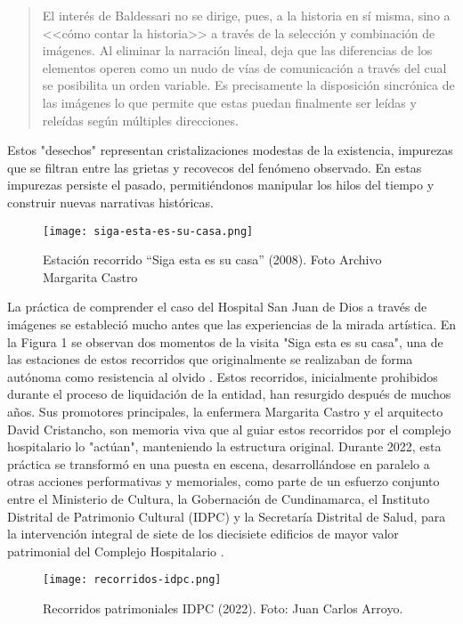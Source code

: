 \begin{quote}
    El interés de Baldessari no se dirige, pues, a la historia en sí misma, sino a <<cómo contar la historia>> a través de la selección y combinación de imágenes. Al eliminar la narración lineal, deja que las diferencias de los elementos operen como un nudo de vías de comunicación a través del cual se posibilita un orden variable. Es precisamente la disposición sincrónica de las imágenes lo que permite que estas puedan finalmente ser leídas y releídas según múltiples direcciones.\parencite[p. 113-114]{Guasch2011}
\end{quote}

Estos "desechos" representan cristalizaciones modestas de la existencia, impurezas que se filtran entre las grietas y recovecos del fenómeno observado. En estas impurezas persiste el pasado, permitiéndonos manipular los hilos del tiempo y construir nuevas narrativas históricas.

 
\begin{figure}[h]
    \centering
    \texttt{[image: siga-esta-es-su-casa.png]}
    \caption{Estación recorrido ``Siga esta es su casa'' (2008). Foto Archivo Margarita Castro}
    \end{figure}
    
La práctica de comprender el caso del Hospital San Juan de Dios a través de imágenes se estableció mucho antes que las experiencias de la mirada artística. En la Figura 1 se observan dos momentos de la visita "Siga esta es su casa", una de las estaciones de estos recorridos que originalmente se realizaban de forma autónoma como resistencia al olvido \parencite{Gongora2013}. Estos recorridos, inicialmente prohibidos durante el proceso de liquidación de la entidad, han resurgido después de muchos años. Sus promotores principales, la enfermera Margarita Castro y el arquitecto David Cristancho, son memoria viva que al guiar estos recorridos por el complejo hospitalario lo "actúan", manteniendo la estructura original. Durante 2022, esta práctica se transformó en una puesta en escena, desarrollándose en paralelo a otras acciones performativas y memoriales, como parte de un esfuerzo conjunto entre el Ministerio de Cultura, la Gobernación de Cundinamarca, el Instituto Distrital de Patrimonio Cultural (IDPC) y la Secretaría Distrital de Salud, para la intervención integral de siete de los diecisiete edificios de mayor valor patrimonial del Complejo Hospitalario \parencite{IDPCSanJuanDeDios}.
    
\begin{figure}[h]
    \centering
    \texttt{[image: recorridos-idpc.png]}
    \caption{Recorridos patrimoniales IDPC (2022). Foto: Juan Carlos Arroyo.}
\end{figure}

